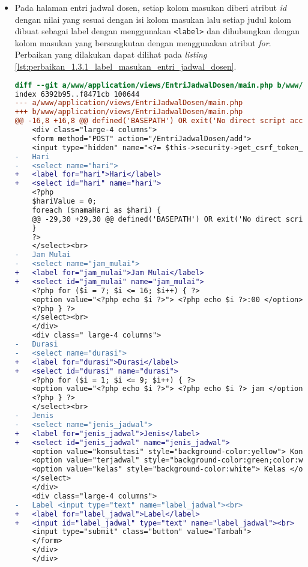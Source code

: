 \begin{itemize}
\item Pada halaman entri jadwal dosen, setiap kolom masukan diberi atribut \textit{id} dengan nilai yang sesuai dengan isi kolom masukan lalu setiap judul kolom dibuat sebagai label dengan menggunakan \texttt{<label>} dan dihubungkan dengan kolom masukan yang bersangkutan dengan menggunakan atribut \textit{for}. Perbaikan yang dilakukan dapat dilihat pada \textit{listing} \ref{lst:perbaikan_1.3.1_label_masukan_entri_jadwal_dosen}.
\begin{lstlisting}[frame=single, label={lst:perbaikan_1.3.1_label_masukan_entri_jadwal_dosen}, language=diff, caption=Perbaikan Kriteria Sukses 1.3.1 - Tidak Terdapat Label pada Kolom Masukan di Halaman Entri Jadwal Dosen]
diff --git a/www/application/views/EntriJadwalDosen/main.php b/www/application/views/EntriJadwalDosen/main.php
index 6392b95..f8471cb 100644
--- a/www/application/views/EntriJadwalDosen/main.php
+++ b/www/application/views/EntriJadwalDosen/main.php
@@ -16,8 +16,8 @@ defined('BASEPATH') OR exit('No direct script access allowed');
    <div class="large-4 columns">
    <form method="POST" action="/EntriJadwalDosen/add">
    <input type="hidden" name="<?= $this->security->get_csrf_token_name() ?>" value="<?= $this->security->get_csrf_hash() ?>" />
-   Hari
-   <select name="hari"> 
+   <label for="hari">Hari</label>
+   <select id="hari" name="hari">
    <?php
    $hariValue = 0;
    foreach ($namaHari as $hari) {
    @@ -29,30 +29,30 @@ defined('BASEPATH') OR exit('No direct script access allowed');
    }
    ?>
    </select><br>
-   Jam Mulai
-   <select name="jam_mulai"> 
+   <label for="jam_mulai">Jam Mulai</label>
+   <select id="jam_mulai" name="jam_mulai"> 
    <?php for ($i = 7; $i <= 16; $i++) { ?>
    <option value="<?php echo $i ?>"> <?php echo $i ?>:00 </option>
    <?php } ?>
    </select><br>
    </div>
    <div class=" large-4 columns">
-   Durasi
-   <select name="durasi"> 
+   <label for="durasi">Durasi</label>
+   <select id="durasi" name="durasi"> 
    <?php for ($i = 1; $i <= 9; $i++) { ?>
    <option value="<?php echo $i ?>"> <?php echo $i ?> jam </option>
    <?php } ?>
    </select><br>
-   Jenis  
-   <select name="jenis_jadwal"> 
+   <label for="jenis_jadwal">Jenis</label>
+   <select id="jenis_jadwal" name="jenis_jadwal"> 
    <option value="konsultasi" style="background-color:yellow"> Konsultasi </option>
    <option value="terjadwal" style="background-color:green;color:white"> Terjadwal</option>
    <option value="kelas" style="background-color:white"> Kelas </option>
    </select>
    </div>
    <div class="large-4 columns">
-   Label <input type="text" name="label_jadwal"><br>
+   <label for="label_jadwal">Label</label>
+   <input id="label_jadwal" type="text" name="label_jadwal"><br>
    <input type="submit" class="button" value="Tambah">
    </form>
    </div>
    </div>
\end{lstlisting}
\end{itemize}

